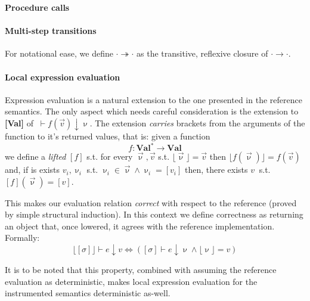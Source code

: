 \documentclass[12pt,a4paper,twoside]{book}
\begin{document}
\noindent\textbf{Procedure calls}
\begin{mathpar}
\end{mathpar}

\paragraph{Multi-step transitions}
For notational ease, we define $\cdot \twoheadrightarrow \cdot$ as the transitive, reflexive closure of $\cdot \rightarrow \cdot$.

\paragraph{Local expression evaluation}
Expression evaluation is a natural extension to the one presented in the reference semantics. The only aspect which needs careful consideration is the extension to \textbf{[Val]} of $~\vdash f(\vec{v}) \downarrow \upnu$.
The extension \emph{carries} brackets from the arguments of the function to it's returned values, that is: given a function
$$
f: \textbf{Val}^{*} \rightarrow \textbf{Val}
$$
we define a \emph{lifted} $[f]$ s.t. for every $\vec{\upnu}, \vec{v}$ s.t.
$\lfloor \vec{\upnu} \rfloor = \vec{v}$ then
$\lfloor f(\vec{\upnu}) \rfloor = f(\vec{v}) $
and, if is exists $v_i, \upnu_i$ s.t. $\upnu_i \in \vec{\upnu} \land \upnu_i = [v_i]$ then, there exists $v~$ s.t. $ [f](\vec{\upnu}) = [v] $.


This makes our evaluation relation \emph{correct} with respect to the reference (proved by simple structural induction). In this context we define correctness as returning an object that, once lowered, it agrees with the reference implementation.\\
Formally:
\begin{equation}\label{inst:loc_correct}
\lfloor [\sigma] \rfloor \vdash e \downarrow v \Leftrightarrow ( [\sigma] \vdash e \downarrow \upnu \land \lfloor \upnu \rfloor = v )
\end{equation}

It is to be noted that this property, combined with assuming the reference evaluation as deterministic, makes local expression evaluation for the instrumented semantics deterministic as-well.
\end{document}
